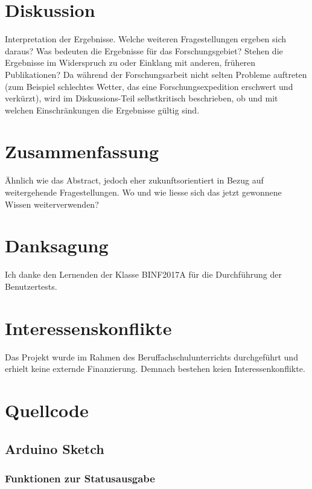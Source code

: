 \section{Diskussion}
Interpretation der Ergebnisse. Welche weiteren Fragestellungen ergeben sich daraus? 
Was bedeuten die Ergebnisse für das Forschungsgebiet? Stehen die Ergebnisse im Widerspruch 
zu oder Einklang mit anderen, früheren Publikationen? Da während der Forschungsarbeit nicht 
selten Probleme auftreten (zum Beispiel schlechtes Wetter, das eine Forschungsexpedition 
erschwert und verkürzt), wird im Diskussions-Teil selbstkritisch beschrieben, ob und mit 
welchen Einschränkungen die Ergebnisse gültig sind.

\section{Zusammenfassung}
Ähnlich wie das Abstract, jedoch eher zukunftsorientiert in Bezug auf weitergehende 
Fragestellungen. Wo und wie liesse sich das jetzt gewonnene Wissen weiterverwenden?

\section{Danksagung}
Ich danke den Lernenden der Klasse BINF2017A für die Durchführung der Benutzertests.

\section{Interessenskonflikte}
Das Projekt wurde im Rahmen des Beruffachschulunterrichts durchgeführt und erhielt
keine externde Finanzierung. Demnach bestehen keien Interessenkonflikte.

\newpage
\printbibliography

\newpage
\appendix{}
\section{Quellcode}

\subsection{Arduino Sketch}

\subsubsection{Funktionen zur Statusausgabe}

